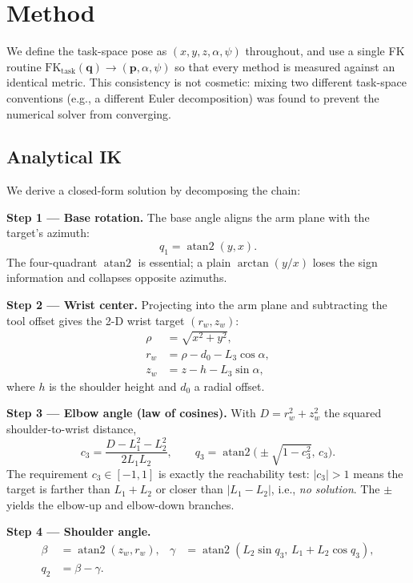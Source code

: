 \documentclass[conference]{IEEEtran}
\begin{document}
\section{Method}

We define the task-space pose as $(x,y,z,\alpha,\psi)$ throughout, and use a single FK routine $\mathrm{FK}_{\mathrm{task}}(\mathbf{q})\!\to\!(\mathbf{p},\alpha,\psi)$ so that every method is measured against an identical metric. This consistency is not cosmetic: mixing two different task-space conventions (e.g., a different Euler decomposition) was found to prevent the numerical solver from converging.

\subsection{Analytical IK}
\label{sec:analytical}

We derive a closed-form solution by decomposing the chain:

\textbf{Step 1 --- Base rotation.} The base angle aligns the arm plane with the target's azimuth:
\begin{equation}
q_1 = \operatorname{atan2}(y, x).
\end{equation}
The four-quadrant $\operatorname{atan2}$ is essential; a plain $\arctan(y/x)$ loses the sign information and collapses opposite azimuths.

\textbf{Step 2 --- Wrist center.} Projecting into the arm plane and subtracting the tool offset gives the 2-D wrist target $(r_w, z_w)$:
\begin{align}
\rho &= \sqrt{x^2 + y^2}, \\
r_w &= \rho - d_0 - L_3 \cos\alpha, \\
z_w &= z - h - L_3 \sin\alpha,
\end{align}
where $h$ is the shoulder height and $d_0$ a radial offset.

\textbf{Step 3 --- Elbow angle (law of cosines).} With $D = r_w^2 + z_w^2$ the squared shoulder-to-wrist distance,
\begin{equation}
c_3 = \frac{D - L_1^2 - L_2^2}{2 L_1 L_2}, \qquad
q_3 = \operatorname{atan2}\!\big(\pm\sqrt{1 - c_3^2},\, c_3\big).
\label{eq:cosine}
\end{equation}
The requirement $c_3 \in [-1, 1]$ is exactly the reachability test: $|c_3|>1$ means the target is farther than $L_1{+}L_2$ or closer than $|L_1{-}L_2|$, i.e., \emph{no solution}. The $\pm$ yields the elbow-up and elbow-down branches.

\textbf{Step 4 --- Shoulder angle.}
\begin{align}
\beta &= \operatorname{atan2}(z_w, r_w), &
\gamma &= \operatorname{atan2}(L_2\sin q_3,\, L_1 + L_2\cos q_3), \nonumber\\
q_2 &= \beta - \gamma. &&
\end{align}
\end{document}

